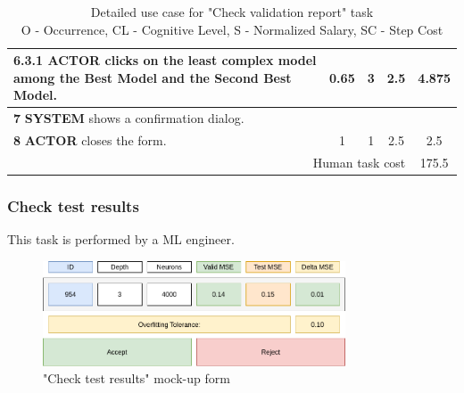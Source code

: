 \begin{table}[H]
\begin{tabularx}{\textwidth}{|X|c|c|c|c|}
\hline
\textbf{6.3.1} \textbf{ACTOR} clicks on the least complex model among the Best Model and the Second Best Model. & 0.65 & 3 & 2.5 & 4.875 \\
\hline
\textbf{7} \textbf{SYSTEM} shows a confirmation dialog. & & & & \\
\hline
\textbf{8} \textbf{ACTOR} closes the form. & 1 & 1 & 2.5 & 2.5 \\
\hline
\multicolumn{4}{|r|}{Human task cost} & 175.5 \\
\hline
\end{tabularx}
\caption{Detailed use case for "Check validation report" task\\ 
O - Occurrence, CL - Cognitive Level, S - Normalized Salary, SC - Step Cost}
\label{table:check_validation_report}
\end{table}

\subsubsection{Check test results}

This task is performed by a ML engineer.

\begin{figure}[H]
\centering
\includegraphics[width=0.8\textwidth]{figures/check_test_results.pdf}
\caption{"Check test results" mock-up form}
\end{figure}

